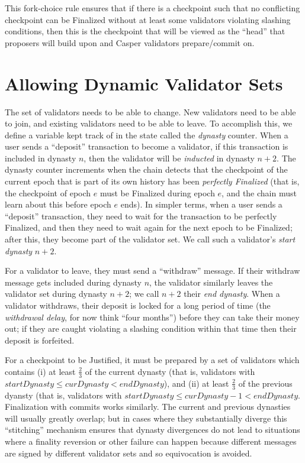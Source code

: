 \documentclass[12pt]{article}
\newcommand{\epoch}{\ensuremath{e}\xspace}
\begin{document}
This fork-choice rule ensures that if there is a checkpoint such that no conflicting checkpoint can be Finalized without at least some validators violating slashing conditions, then this is the checkpoint that will be viewed as the ``head'' that proposers will build upon and Casper validators prepare/commit on.

\section{Allowing Dynamic Validator Sets}
\label{sect:join_and_leave}

The set of validators needs to be able to change.  New validators need to be able to join, and existing validators need to be able to leave.  To accomplish this, we define a variable kept track of in the state called the \textit{dynasty} counter. When a user sends a ``deposit'' transaction to become a validator, if this transaction is included in dynasty $n$, then the validator will be \textit{inducted} in dynasty $n+2$. The dynasty counter increments when the chain detects that the checkpoint of the current epoch that is part of its own history has been \textit{perfectly Finalized} (that is, the checkpoint of epoch \epoch must be Finalized during epoch \epoch, and the chain must learn about this before epoch \epoch ends). In simpler terms, when a user sends a ``deposit'' transaction, they need to wait for the transaction to be perfectly Finalized, and then they need to wait again for the next epoch to be Finalized; after this, they become part of the validator set. We call such a validator's \textit{start dynasty} $n+2$.

For a validator to leave, they must send a ``withdraw'' message. If their withdraw message gets included during dynasty $n$, the validator similarly leaves the validator set during dynasty $n+2$; we call $n+2$ their \textit{end dynasty}. When a validator withdraws, their deposit is locked for a long period of time (the \textit{withdrawal delay}, for now think ``four months'') before they can take their money out; if they are caught violating a slashing condition within that time then their deposit is forfeited.

For a checkpoint to be Justified, it must be prepared by a set of validators which contains (i) at least $\frac{2}{3}$ of the current dynasty (that is, validators with $startDynasty \le curDynasty < endDynasty$), and (ii) at least $\frac{2}{3}$ of the previous dyansty (that is, validators with $startDynasty \le curDynasty - 1 < endDynasty$. Finalization with commits works similarly. The current and previous dynasties will usually greatly overlap; but in cases where they substantially diverge this ``stitching'' mechanism ensures that dynasty divergences do not lead to situations where a finality reversion or other failure can happen because different messages are signed by different validator sets and so equivocation is avoided.
\end{document}
